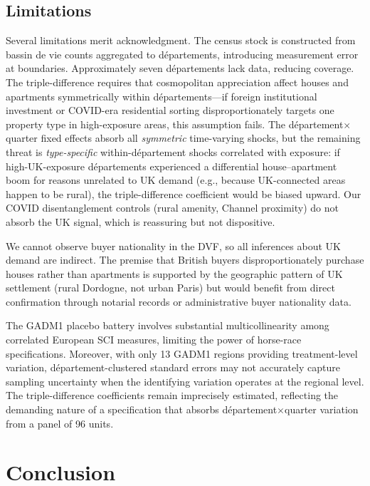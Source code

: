 \documentclass[12pt]{article}
\begin{document}
\subsection{Limitations}

Several limitations merit acknowledgment. The census stock is constructed from bassin de vie counts aggregated to d\'epartements, introducing measurement error at boundaries. Approximately seven d\'epartements lack data, reducing coverage. The triple-difference requires that cosmopolitan appreciation affect houses and apartments symmetrically within d\'epartements---if foreign institutional investment or COVID-era residential sorting disproportionately targets one property type in high-exposure areas, this assumption fails. The d\'epartement$\times$quarter fixed effects absorb all \textit{symmetric} time-varying shocks, but the remaining threat is \textit{type-specific} within-d\'epartement shocks correlated with exposure: if high-UK-exposure d\'epartements experienced a differential house--apartment boom for reasons unrelated to UK demand (e.g., because UK-connected areas happen to be rural), the triple-difference coefficient would be biased upward. Our COVID disentanglement controls (rural amenity, Channel proximity) do not absorb the UK signal, which is reassuring but not dispositive.

We cannot observe buyer nationality in the DVF, so all inferences about UK demand are indirect. The premise that British buyers disproportionately purchase houses rather than apartments is supported by the geographic pattern of UK settlement (rural Dordogne, not urban Paris) but would benefit from direct confirmation through notarial records or administrative buyer nationality data.

The GADM1 placebo battery involves substantial multicollinearity among correlated European SCI measures, limiting the power of horse-race specifications. Moreover, with only 13 GADM1 regions providing treatment-level variation, d\'epartement-clustered standard errors may not accurately capture sampling uncertainty when the identifying variation operates at the regional level. The triple-difference coefficients remain imprecisely estimated, reflecting the demanding nature of a specification that absorbs d\'epartement$\times$quarter variation from a panel of 96 units.


\section{Conclusion}\label{sec:conclusion}
\end{document}
